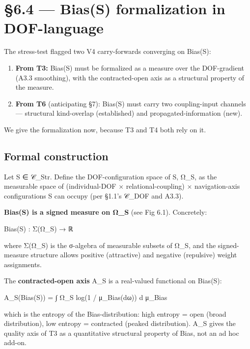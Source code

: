 \documentclass[11pt, openany]{book}
\newcommand{\sectionbreak}{\clearpage}
\begin{document}
\sectionbreak

\section{§6.4 --- Bias(S) formalization in DOF-language}

The stress-test flagged two V4 carry-forwards converging on Bias(S):

\begin{enumerate}
\item \textbf{From T3:} Bias(S) must be formalized as a measure over the DOF-gradient (A3.3 smoothing), with the contracted-open axis as a structural property of the measure.
\item \textbf{From T6} (anticipating §7): Bias(S) must carry two coupling-input channels --- structural kind-overlap (established) and propagated-information (new).
\end{enumerate}

We give the formalization now, because T3 and T4 both rely on it.

\subsection{Formal construction}

Let S ∈ 𝒞\_\allowbreak{}Str. Define the DOF-configuration space of S, Ω\_\allowbreak{}S, as the measurable space of (individual-DOF × relational-coupling) × navigation-axis configurations S can occupy (per §1.1's 𝒞\_\allowbreak{}DOF and A3.3).

\textbf{Bias(S) is a signed measure on Ω\_\allowbreak{}S} (see Fig 6.1). Concretely:

\begin{Code}
Bias(S) : Σ(Ω_S) → ℝ
\end{Code}

where Σ(Ω\_\allowbreak{}S) is the σ-algebra of measurable subsets of Ω\_\allowbreak{}S, and the signed-measure structure allows positive (attractive) and negative (repulsive) weight assignments.

The \textbf{contracted-open axis} A\_\allowbreak{}S is a real-valued functional on Bias(S):

\begin{Code}
A_S(Bias(S)) = ∫ Ω_S log(1 / μ_Bias(dω)) d μ_Bias
\end{Code}

which is the entropy of the Bias-distribution: high entropy = open (broad distribution), low entropy = contracted (peaked distribution). A\_\allowbreak{}S gives the quality axis of T3 as a quantitative structural property of Bias, not an ad hoc add-on.
\end{document}
